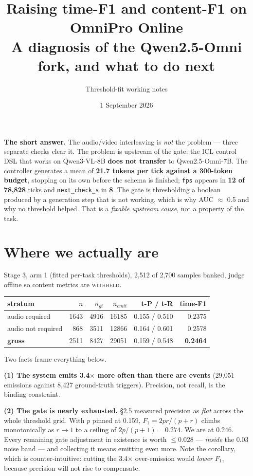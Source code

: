 \documentclass[11pt,a4paper]{article}
\title{\textbf{Raising time-F1 and content-F1 on OmniPro Online}\\[2pt]
\large A diagnosis of the Qwen2.5-Omni fork, and what to do next}
\author{\normalsize Threshold-fit working notes}
\date{\normalsize 1 September 2026}
\newenvironment{keybox}{\begin{shaded}\noindent}{\end{shaded}}
\begin{document}
\maketitle
\vspace{-1.2em}

\begin{keybox}
\textbf{The short answer.} The audio/video interleaving is \emph{not} the problem --- three
separate checks clear it. The problem is upstream of the gate: the ICL control DSL that
works on Qwen3-VL-8B \textbf{does not transfer} to Qwen2.5-Omni-7B. The controller
generates a mean of \textbf{21.7 tokens per tick against a 300-token budget}, stopping on
its own before the schema is finished; \texttt{fps} appears in \textbf{12 of 78{,}828}
ticks and \texttt{next\_check\_s} in \textbf{8}. The gate is thresholding a boolean
produced by a generation step that is not working, which is why AUC $\approx$ 0.5 and why
no threshold helped. That is a \emph{fixable upstream cause}, not a property of the task.
\end{keybox}

\section{Where we actually are}

Stage 3, arm 1 (fitted per-task thresholds), 2{,}512 of 2{,}700 samples banked, judge
offline so content metrics are \textsc{withheld}.

\begin{center}\small
\begin{tabular}{lrrrrr}
\toprule
stratum & $n$ & $n_{gt}$ & $n_{emit}$ & t-P / t-R & \textbf{time-F1} \\
\midrule
audio required      & 1643 & 4916 & 16185 & 0.155 / 0.510 & 0.2375 \\
audio not required  &  868 & 3511 & 12866 & 0.164 / 0.601 & 0.2578 \\
\textbf{gross}      & 2511 & 8427 & 29051 & 0.159 / 0.548 & \textbf{0.2464} \\
\bottomrule
\end{tabular}
\end{center}

\noindent Two facts frame everything below.

\textbf{(1) The system emits 3.4$\times$ more often than there are events} (29{,}051
emissions against 8{,}427 ground-truth triggers). Precision, not recall, is the binding
constraint.

\textbf{(2) The gate is nearly exhausted.} \S2.5 measured precision as \emph{flat} across
the whole threshold grid. With $p$ pinned at 0.159, $F_1 = 2pr/(p+r)$ climbs monotonically
as $r \to 1$ to a ceiling of $2p/(p{+}1) = \mathbf{0.274}$. We are at 0.246. Every
remaining gate adjustment in existence is worth $\le 0.028$ --- \emph{inside} the 0.03
noise band --- and collecting it means emitting even more. Note the corollary, which is
counter-intuitive: cutting the 3.4$\times$ over-emission would \emph{lower} $F_1$, because
precision will not rise to compensate.
\end{document}

